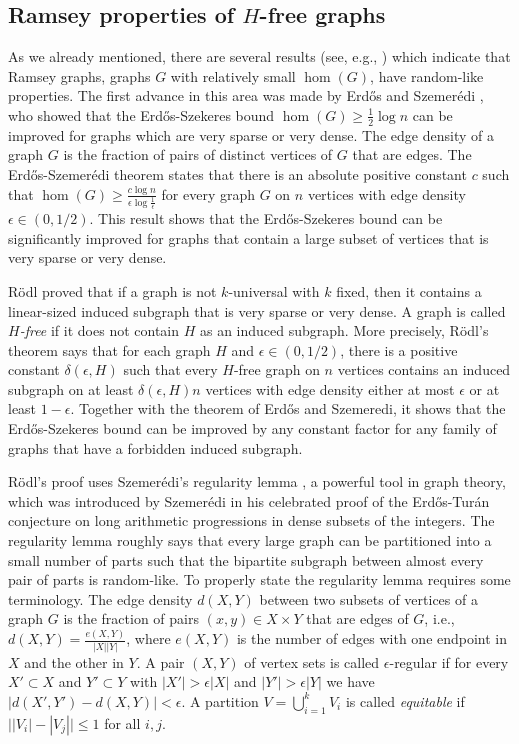 \documentclass[11pt]{article}
\begin{document}
\subsection{Ramsey properties of $H$-free graphs}\label{hfree}

As we already mentioned, there are several results (see, e.g.,
\cite{ErSzem,She,AlKrSu,BuSu}) which indicate that Ramsey graphs,
graphs $G$ with relatively small $\hom(G)$, have random-like
properties. The first advance in this area was made by Erd\H{o}s and
Szemer\'edi \cite{ErSzem}, who showed that the Erd\H{o}s-Szekeres
bound $\hom(G) \geq \frac{1}{2}\log n$ can be improved for graphs
which are very sparse or very dense. The edge density of a graph $G$
is the fraction of pairs of distinct vertices of $G$ that are edges.
The Erd\H{o}s-Szemer\'edi theorem states that there is an absolute
positive constant $c$ such that $\hom(G) \geq \frac{c \log
n}{\epsilon \log \frac{1}{\epsilon}}$ for every graph $G$ on $n$
vertices with edge density $\epsilon \in (0,1/2)$. This result shows
that the Erd\H{o}s-Szekeres bound can be significantly improved for
graphs that contain a large subset of vertices that is very sparse
or very dense.

R\"odl \cite{Ro} proved
that if a graph is not $k$-universal with $k$
fixed, then it contains a linear-sized induced subgraph that is very
sparse or very dense.  A graph is called {\it $H$-free} if it does not
contain $H$ as an induced subgraph. More precisely, R\"odl's theorem says that for
each graph $H$ and $\epsilon \in (0,1/2)$, there is a positive
constant $\delta(\epsilon,H)$ such that every $H$-free graph on $n$
vertices contains an induced subgraph on at least
$\delta(\epsilon,H)n$ vertices with edge density either at most
$\epsilon$ or at least $1-\epsilon$. Together with the theorem of Erd\H{o}s and Szemeredi, it
shows that the Erd\H{o}s-Szekeres bound can be improved by any constant factor
for any family of graphs that have a forbidden induced subgraph.

R\"odl's proof uses Szemer\'edi's regularity lemma \cite{Sz}, a
powerful tool in graph theory, which was introduced by Szemer\'edi
 in his celebrated proof of the Erd\H{o}s-Tur\'an conjecture on long arithmetic progressions in
dense subsets of the integers. The regularity lemma roughly says
that every large graph can be partitioned into a small number of
parts such that the bipartite subgraph between almost every pair of
parts is random-like. To properly state the regularity lemma
requires some terminology. The edge density $d(X,Y)$ between two
subsets of vertices of a graph $G$ is the fraction of pairs $(x,y)
\in X \times Y$ that are edges of $G$, i.e.,
$d(X,Y)=\frac{e(X,Y)}{|X||Y|}$, where $e(X,Y)$ is the number of edges with one endpoint in $X$ and
the other in $Y$.
A pair $(X,Y)$ of vertex sets
is called $\epsilon$-regular if for every $X' \subset X$ and $Y'
\subset Y$ with $|X'| > \epsilon |X|$ and $|Y'| > \epsilon |Y|$ we
have $|d(X',Y')-d(X,Y)|<\epsilon$. A partition $V=\bigcup_{i=1}^k
V_i$ is called {\it equitable} if $\big||V_i|-|V_j|\big|\leq 1$ for
all $i,j$.
\end{document}
